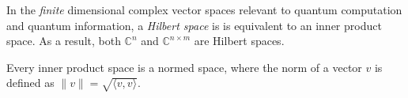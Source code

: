 In the \emph{finite} dimensional complex vector spaces relevant to quantum computation and quantum information, a \emph{Hilbert space} is is equivalent to an inner product space.  As a result, both $\mathbb{C}^{n}$ and $\mathbb{C}^{n \times m}$ are Hilbert spaces.

Every inner product space is a normed space, where the norm of a vector $v$ is defined as $\|v\| = \sqrt{\langle v, v \rangle}$.

